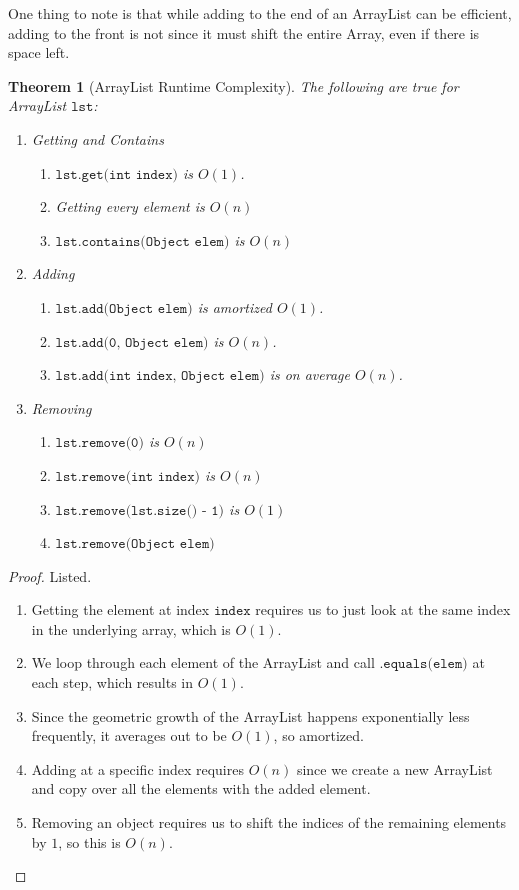 \documentclass{article}
\newtheorem{theorem}{Theorem}[section]
\theoremstyle{definition}
\theoremstyle{remark}
\theoremstyle{definition}
\begin{document}
One thing to note is that while adding to the end of an ArrayList can be efficient, adding to the front is not since it must shift the entire Array, even if there is space left.

\begin{theorem}[ArrayList Runtime Complexity]
The following are true for ArrayList $\texttt{lst}$:  
\begin{enumerate}
    \item Getting and Contains 
    \begin{enumerate}
        \item $\texttt{lst.get(int index)}$ is $O(1)$. 
        \item Getting every element is $O(n)$ 
        \item $\texttt{lst.contains(Object elem)}$ is $O(n)$
    \end{enumerate}
    
    \item Adding 
    \begin{enumerate}
        \item $\texttt{lst.add(Object elem)}$ is amortized $O(1)$. 
        \item $\texttt{lst.add(0, Object elem)}$ is $O(n)$. 
        \item $\texttt{lst.add(int index, Object elem)}$ is on average $O(n)$. 
    \end{enumerate}
    
    \item Removing 
    \begin{enumerate}
        \item $\texttt{lst.remove(0)}$ is $O(n)$ 
        \item $\texttt{lst.remove(int index)}$ is $O(n)$ 
        \item $\texttt{lst.remove(lst.size() - 1)}$ is $O(1)$ 
        \item $\texttt{lst.remove(Object elem)}$ 
    \end{enumerate}
\end{enumerate}
\end{theorem}
\begin{proof}
Listed. 
\begin{enumerate}
    \item Getting the element at index $\texttt{index}$ requires us to just look at the same index in the underlying array, which is $O(1)$. 
    \item We loop through each element of the ArrayList and call $\texttt{.equals(elem)}$ at each step, which results in $O(1)$. 
    \item Since the geometric growth of the ArrayList happens exponentially less frequently, it averages out to be $O(1)$, so amortized. 
    \item Adding at a specific index requires $O(n)$ since we create a new ArrayList and copy over all the elements with the added element.  
    \item Removing an object requires us to shift the indices of the remaining elements by $1$, so this is $O(n)$. 
\end{enumerate}
\end{proof}
\end{document}
